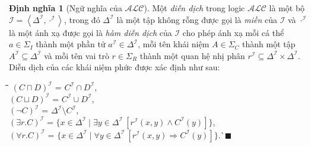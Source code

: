 \documentclass[12pt,a4paper,twoside]{report}
\newcommand{\mI}		{\mathcal{I}}
\newcommand{\SigmaI}	{\Sigma_I}
\newcommand{\SigmaC}	{\Sigma_C}
\newcommand{\SigmaR}	{\Sigma_R}
\newcommand{\ALC}		{$\mathcal{ALC}$\xspace}
\newcommand{\myend}		{\mbox{}\hfill\mbox{{\scriptsize$\!\blacksquare$}}}
\newcommand{\tuple}[1]	{\left\langle#1\right\rangle\!}
\newcommand{\mand}		{\sqcap}
\newcommand{\mor}		{\sqcup}
\newcommand{\V}			{\forall}
\newcommand{\E}			{\exists}
\theoremstyle{definition}
\newtheorem{Definition}{Định nghĩa}[chapter]
\begin{document}
\begin{Definition}[Ngữ nghĩa của \ALC]
Một {\em diễn dịch} trong logic \ALC là một bộ \mbox{$\mI = \tuple{\Delta^\mI, \cdot^\mI}$}, trong đó $\Delta^\mI$ là một tập không rỗng được gọi là {\em miền} của $\mI$ và $\cdot^\mI$ là một ánh xạ được gọi là {\em hàm diễn dịch} của $\mI$ cho phép ánh xạ mỗi cá thể $a \in \SigmaI$ thành một phần tử $a^\mI \in \Delta^\mI$, mỗi tên khái niệm $A \in \SigmaC$ thành một tập $A^\mI \subseteq \Delta^\mI$ và mỗi tên vai trò $r \in \SigmaR$ thành một quan hệ nhị phân $r^\mI \subseteq \Delta^\mI \times \Delta^\mI$.
Diễn dịch của các khái niệm phức được xác định như sau:
\begin{tabbing}
  \hspace*{.85cm}\=\hspace*{1.9cm}\=\hspace*{0.5cm}\=\hspace*{\textwidth}\=\kill
    \> $(C \mand D)^\mI$ \> = \> $C^\mI \cap D^\mI$, \\[0.5ex]
    \> $(C \mor D)^\mI$ \> = \> $C^\mI \cup D^\mI$, \\[0.5ex]
    \> $(\neg C)^\mI$ \> = \> $\Delta^\mI \setminus C^\mI$, \\[0.5ex]
    \> $(\E r.C)^\mI$ \> = \> $\{x \in \Delta^\mI \mid \E y\in \Delta^\mI\ [r^\mI(x,y) \wedge C^\mI(y)]\}$, \\[0.5ex]
    \> $(\V r.C)^\mI$ \> = \> $\{ x \in \Delta^\mI \mid \V y \in \Delta^\mI\ [r^\mI(x,y) \Rightarrow C^\mI(y)]\}$.\`\myend
\end{tabbing}
\end{Definition}
\end{document}
